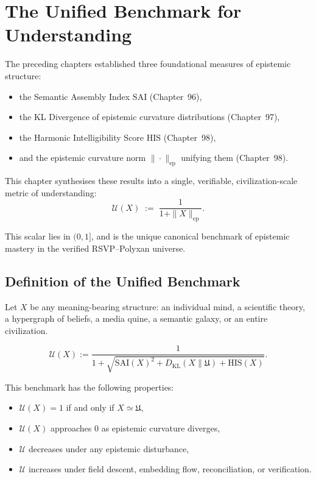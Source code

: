 \chapter{The Unified Benchmark for Understanding}
\label{ch:unified-benchmark}

The preceding chapters established three foundational measures of epistemic
structure:

\begin{itemize}
\item the Semantic Assembly Index $\mathrm{SAI}$ (Chapter~96),
\item the KL Divergence of epistemic curvature distributions (Chapter~97),
\item the Harmonic Intelligibility Score $\mathrm{HIS}$ (Chapter~98),
\item and the epistemic curvature norm $\|\cdot\|_{\mathrm{ep}}$ unifying them (Chapter~98).
\end{itemize}

This chapter synthesises these results into a single,
verifiable, civilization-scale metric of understanding:
\[
\mathcal{U}(X)
  \;:=\;
  \frac{1}{1 + \|X\|_{\mathrm{ep}}}.
\]

This scalar lies in $(0,1]$,
and is the unique canonical benchmark of epistemic mastery
in the verified RSVP--Polyxan universe.

\section{Definition of the Unified Benchmark}

Let $X$ be any meaning-bearing structure:
an individual mind, a scientific theory, a hypergraph of beliefs,
a media quine, a semantic galaxy, or an entire civilization.

\begin{definition}
\[
\mathcal{U}(X)
  :=
  \frac{1}{1 + 
    \sqrt{
      \mathrm{SAI}(X)^2
      +
      D_{\mathrm{KL}}(X\|\mathfrak{U})
      +
      \mathrm{HIS}(X)
    }
  }.
\]
\end{definition}

This benchmark has the following properties:

\begin{itemize}
\item $\mathcal{U}(X)=1$ if and only if $X\simeq\mathfrak{U}$,
\item $\mathcal{U}(X)$ approaches 0 as epistemic curvature diverges,
\item $\mathcal{U}$ decreases under any epistemic disturbance,
\item $\mathcal{U}$ increases under field descent, embedding flow, 
      reconciliation, or verification.
\end{itemize}


